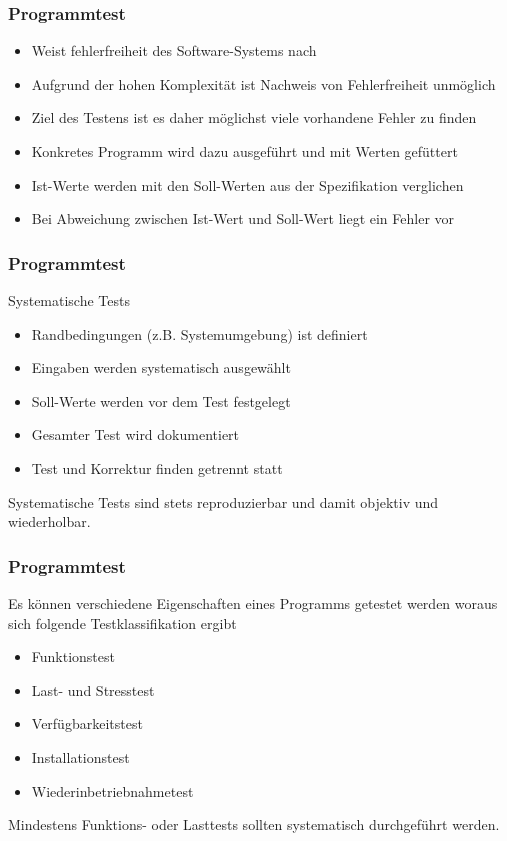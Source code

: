 \begin{frame}
\frametitle{Programmtest}
	\begin{itemize}
		\item Weist fehlerfreiheit des Software-Systems nach
		\item Aufgrund der hohen Komplexität ist Nachweis von Fehlerfreiheit unmöglich
		\item Ziel des Testens ist es daher möglichst viele vorhandene Fehler zu finden
		\item Konkretes Programm wird dazu ausgeführt und mit Werten gefüttert
		\item Ist-Werte werden mit den Soll-Werten aus der Spezifikation verglichen
		\item Bei Abweichung zwischen Ist-Wert und Soll-Wert liegt ein Fehler vor
	\end{itemize}
\end{frame}

\begin{frame}
\frametitle{Programmtest}
	Systematische Tests
	\begin{itemize}
		\item Randbedingungen (z.B. Systemumgebung) ist definiert
		\item Eingaben werden systematisch ausgewählt
		\item Soll-Werte werden vor dem Test festgelegt
		\item Gesamter Test wird dokumentiert
		\item Test und Korrektur finden getrennt statt
	\end{itemize}
	Systematische Tests sind stets reproduzierbar und damit objektiv und wiederholbar.
\end{frame}

\begin{frame}
\frametitle{Programmtest}
	Es können verschiedene Eigenschaften eines Programms getestet werden woraus sich folgende
	Testklassifikation ergibt
	\begin{itemize}
		\item Funktionstest
		\item Last- und Stresstest
		\item Verfügbarkeitstest
		\item Installationstest
		\item Wiederinbetriebnahmetest
	\end{itemize}
	Mindestens Funktions- oder Lasttests sollten systematisch durchgeführt werden.
\end{frame}

